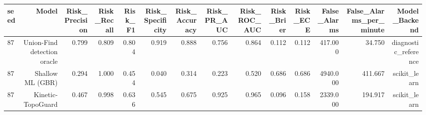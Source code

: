\begin{tabular}{lrrrrrrrrrrrrr}
\toprule
seed & Model & Risk\_Precision & Risk\_Recall & Risk\_F1 & Risk\_Specificity & Risk\_Accuracy & Risk\_PR\_AUC & Risk\_ROC\_AUC & Risk\_Brier & Risk\_ECE & False\_Alarms & False\_Alarms\_per\_minute & Model\_Backend \\
\midrule
87 & Union-Find detection oracle & 0.799 & 0.809 & 0.804 & 0.919 & 0.888 & 0.756 & 0.864 & 0.112 & 0.112 & 417.000 & 34.750 & diagnostic\_reference \\
87 & Shallow ML (GBR) & 0.294 & 1.000 & 0.454 & 0.040 & 0.314 & 0.223 & 0.520 & 0.686 & 0.686 & 4940.000 & 411.667 & scikit\_learn \\
87 & Kinetic-TopoGuard & 0.467 & 0.998 & 0.636 & 0.545 & 0.675 & 0.925 & 0.965 & 0.096 & 0.158 & 2339.000 & 194.917 & scikit\_learn \\
\bottomrule
\end{tabular}